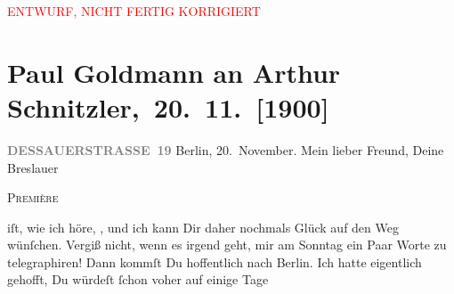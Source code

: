 
\begin{center}
            \textcolor{red}{ENTWURF, NICHT FERTIG KORRIGIERT}
                      \end{center}
            
         
         \newcommand{\erwaehntePersonen}{Personen: Richard Beer-Hofmann}
         \newcommand{\erwaehnteOrte}{Orte: Berlin, Breslau, Dessauer Straße, Hotel Continental (Berlin), Palasthotel Berlin, Wien}
         \newcommand{\erwaehnteWerke}{Werke: Der Schleier der Beatrice. Schauspiel in fünf Akten}
               \section[ Paul Goldmann an Arthur Schnitzler, 20. 11. {[}1900{]}]{ Paul Goldmann an Arthur Schnitzler, 20. 11. {[}1900{]}}\nopagebreak{}\rehead{ }\begin{ledgroupsized}[t]{13cm}\normalsize\beginnumbering \toendnotes[C]{\smallbreak\pagebreak[2]} 
\toendnotes[C]{\smallbreak}\pstart{}{\pb}\textcolor{gray}{\textbf{DESSAUERSTRASSE 19}}\pend{}{\bigskip}\pstart
           Berlin, 20. November.\pend
           \pstart{}Mein lieber Freund,\pend\pstart
           Deine Breslauer \begin{otherlanguage}{french}\textsc{Première}\end{otherlanguage} iſt, wie ich höre, \label{K_L02939-1v}\label{K_L02939-1h}, und ich kann Dir daher nochmals Glück auf den Weg wünſchen. Vergiß nicht,
               wenn es irgend geht, mir am Sonntag ein Paar Worte zu
               telegraphiren! Dann kommſt Du hoffentlich nach Berlin. Ich hatte eigentlich gehofft, Du würdeſt ſchon voher auf einige Tage

\end{ledgroupsized}
